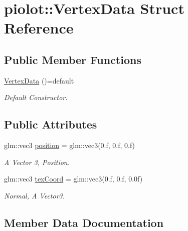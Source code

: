 \hypertarget{structpiolot_1_1_vertex_data}{}\section{piolot\+:\+:Vertex\+Data Struct Reference}
\label{structpiolot_1_1_vertex_data}
\subsection*{Public Member Functions}
\begin{DoxyCompactItemize}
\item 
\mbox{\label{structpiolot_1_1_vertex_data_ab5710817488ea549782c284288dfe42b}} 
\mbox{\hyperlink{structpiolot_1_1_vertex_data_ab5710817488ea549782c284288dfe42b}{Vertex\+Data}} ()=default
\begin{DoxyCompactList}\small\item\em Default Constructor. \end{DoxyCompactList}\end{DoxyCompactItemize}
\subsection*{Public Attributes}
\begin{DoxyCompactItemize}
\item 
\mbox{\label{structpiolot_1_1_vertex_data_ae69924bb32a5d744c5978787936ec50c}} 
glm\+::vec3 \mbox{\hyperlink{structpiolot_1_1_vertex_data_ae69924bb32a5d744c5978787936ec50c}{position}} = glm\+::vec3(0.f, 0.f, 0.f)
\begin{DoxyCompactList}\small\item\em A Vector 3, Position. \end{DoxyCompactList}\item 
glm\+::vec3 \mbox{\hyperlink{structpiolot_1_1_vertex_data_a5cb8263b64bf377f3cb1dc876b71b183}{tex\+Coord}} = glm\+::vec3(0.f, 0.f, 0.\+0f)
\begin{DoxyCompactList}\small\item\em Normal, A Vector3. \end{DoxyCompactList}\end{DoxyCompactItemize}


\subsection{Member Data Documentation}
\mbox{\label{structpiolot_1_1_vertex_data_a5cb8263b64bf377f3cb1dc876b71b183}} 
